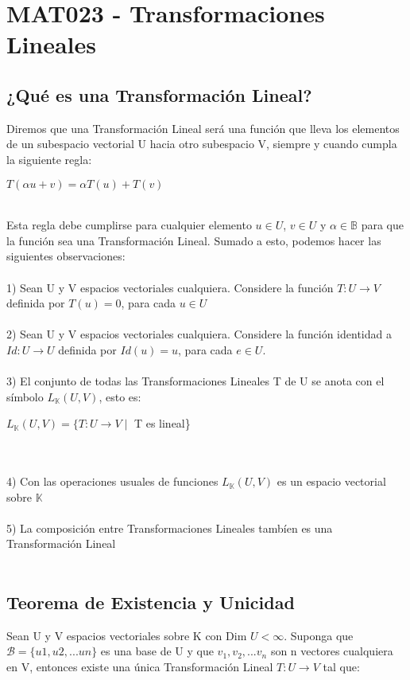 \documentclass[12pt]{article}
\begin{document}
\section*{MAT023 - Transformaciones Lineales}

\subsection*{¿Qué es una Transformación Lineal?}

Diremos que una Transformación Lineal será una función que lleva los elementos de 
un subespacio vectorial U hacia otro subespacio V, siempre y cuando cumpla la 
siguiente regla:
\begin{center}
$ T(\alpha u + v) = \alpha T(u) + T(v) $
\end{center}
\\
Esta regla debe cumplirse para cualquier elemento $u \in U$, $v \in U$ y $\alpha \in 
\mathbb{B}$ para que la función sea una Transformación Lineal. Sumado a esto, podemos 
hacer las siguientes observaciones:
\\
\\
1) Sean U y V espacios vectoriales cualquiera. Considere la función 
$T : U \to V$ definida por $T(u) = 0$, para cada $u \in U$
\\
\\
2) Sean U y V espacios vectoriales cualquiera. Considere la función identidad a 
$Id : U \to U$ definida por 
$Id(u) = u$, para cada $e \in U$.
\\
\\
3) El conjunto de todas las Transformaciones Lineales T de U se anota con el símbolo 
$L_\mathbb{K}(U,V)$, esto es:

\begin{center}
$ L_\mathbb{K}(U,V) = \{ T : U \to V \mid$ T es lineal\}
\end{center}
\\
\\
4) Con las operaciones usuales de funciones $L_\mathbb{K}(U,V)$ es un espacio vectorial 
sobre $\mathbb{K}$ 
\\
\\
5) La composición entre Transformaciones Lineales tambíen es una Transformación Lineal
\\
\\
\newpage
\subsection*{Teorema de Existencia y Unicidad}
Sean U y V espacios vectoriales sobre K con Dim $U < \infty$. Suponga que 
$\mathcal{B} = \{u1, u2, ... un\}$
es una base de U y que $v_1, v_2, ... v_n$ son n vectores cualquiera en V, entonces 
existe una única Transformación Lineal $T: U \to V$ tal que:
\end{document}
